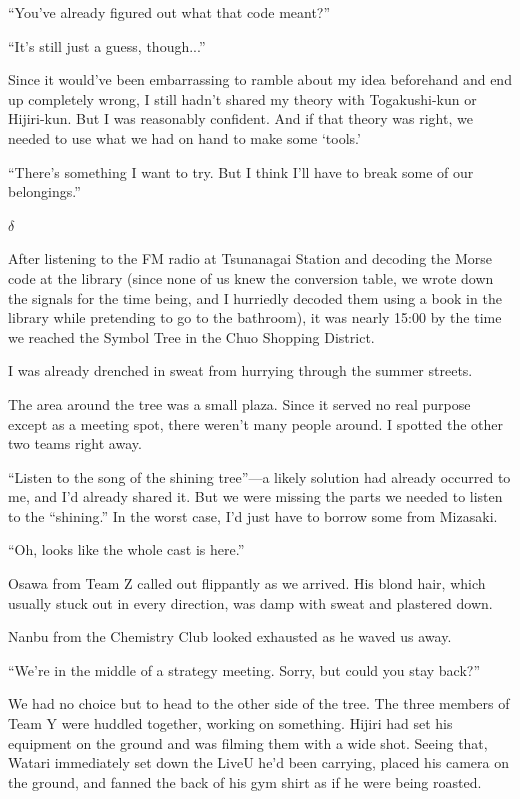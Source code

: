 \documentclass[
    a4paper,
    12pt,
    twoside,
    openany,
    UTF8,
    fontset=windows
]{ctexbook}
\begin{document}
``You've already figured out what that code meant?''

``It's still just a guess, though...''

Since it would've been embarrassing to ramble about my idea beforehand and end up completely wrong, I still hadn't shared my theory with Togakushi-kun or Hijiri-kun. But I was reasonably confident. And if that theory was right, we needed to use what we had on hand to make some `tools.'

``There's something I want to try. But I think I'll have to break some of our belongings.''

$\delta$

After listening to the FM radio at Tsunanagai Station and decoding the Morse code at the library (since none of us knew the conversion table, we wrote down the signals for the time being, and I hurriedly decoded them using a book in the library while pretending to go to the bathroom), it was nearly 15:00 by the time we reached the Symbol Tree in the Chuo Shopping District.

I was already drenched in sweat from hurrying through the summer streets.

The area around the tree was a small plaza. Since it served no real purpose except as a meeting spot, there weren't many people around. I spotted the other two teams right away.

``Listen to the song of the shining tree''---a likely solution had already occurred to me, and I'd already shared it. But we were missing the parts we needed to listen to the ``shining.'' In the worst case, I'd just have to borrow some from Mizasaki.

``Oh, looks like the whole cast is here.''

Osawa from Team Z called out flippantly as we arrived. His blond hair, which usually stuck out in every direction, was damp with sweat and plastered down.

Nanbu from the Chemistry Club looked exhausted as he waved us away.

``We're in the middle of a strategy meeting. Sorry, but could you stay back?''

We had no choice but to head to the other side of the tree. The three members of Team Y were huddled together, working on something. Hijiri had set his equipment on the ground and was filming them with a wide shot. Seeing that, Watari immediately set down the LiveU he'd been carrying, placed his camera on the ground, and fanned the back of his gym shirt as if he were being roasted.
\end{document}
